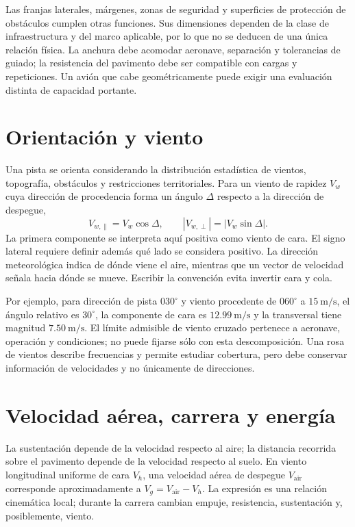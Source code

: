 Las franjas laterales, márgenes, zonas de seguridad y superficies de protección de obstáculos cumplen otras funciones. Sus dimensiones dependen de la clase de infraestructura y del marco aplicable, por lo que no se deducen de una única relación física. La anchura debe acomodar aeronave, separación y tolerancias de guiado; la resistencia del pavimento debe ser compatible con cargas y repeticiones. Un avión que cabe geométricamente puede exigir una evaluación distinta de capacidad portante.

\section{Orientación y viento}
Una pista se orienta considerando la distribución estadística de vientos, topografía, obstáculos y restricciones territoriales. Para un viento de rapidez $V_w$ cuya dirección de procedencia forma un ángulo $\Delta$ respecto a la dirección de despegue,
\begin{equation}\label{eq:13-wind}
V_{w,\parallel}=V_w\cos\Delta,\qquad
|V_{w,\perp}|=|V_w\sin\Delta|.
\end{equation}
La primera componente se interpreta aquí positiva como viento de cara. El signo lateral requiere definir además qué lado se considera positivo. La dirección meteorológica indica de dónde viene el aire, mientras que un vector de velocidad señala hacia dónde se mueve. Escribir la convención evita invertir cara y cola.

Por ejemplo, para dirección de pista $030^\circ$ y viento procedente de $060^\circ$ a $15\ \mathrm{m/s}$, el ángulo relativo es $30^\circ$, la componente de cara es $12.99\ \mathrm{m/s}$ y la transversal tiene magnitud $7.50\ \mathrm{m/s}$. El límite admisible de viento cruzado pertenece a aeronave, operación y condiciones; no puede fijarse sólo con esta descomposición. Una rosa de vientos describe frecuencias y permite estudiar cobertura, pero debe conservar información de velocidades y no únicamente de direcciones.

\section{Velocidad aérea, carrera y energía}
La sustentación depende de la velocidad respecto al aire; la distancia recorrida sobre el pavimento depende de la velocidad respecto al suelo. En viento longitudinal uniforme de cara $V_h$, una velocidad aérea de despegue $V_{\mathrm{air}}$ corresponde aproximadamente a $V_g=V_{\mathrm{air}}-V_h$. La expresión es una relación cinemática local; durante la carrera cambian empuje, resistencia, sustentación y, posiblemente, viento.


